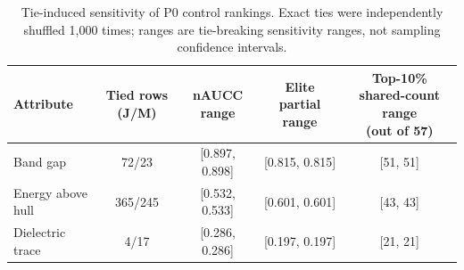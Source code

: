 \documentclass[11pt]{article}
\begin{document}
\begin{table}[htbp]
\scriptsize
\setlength{\tabcolsep}{2pt}
\centering
\caption{Tie-induced sensitivity of P0 control rankings. Exact ties were independently shuffled 1,000 times; ranges are tie-breaking sensitivity ranges, not sampling confidence intervals.}
\label{tab:si_control_ties}
\begin{tabular}{l c c c c}
\toprule
Attribute & Tied rows (J/M) & nAUCC range & Elite partial range & \shortstack{Top-10\% shared-count range\\(out of 57)} \\
\midrule
Band gap & 72/23 & [0.897, 0.898] & [0.815, 0.815] & [51, 51] \\
Energy above hull & 365/245 & [0.532, 0.533] & [0.601, 0.601] & [43, 43] \\
Dielectric trace & 4/17 & [0.286, 0.286] & [0.197, 0.197] & [21, 21] \\
\bottomrule
\end{tabular}
\end{table}
\end{document}
